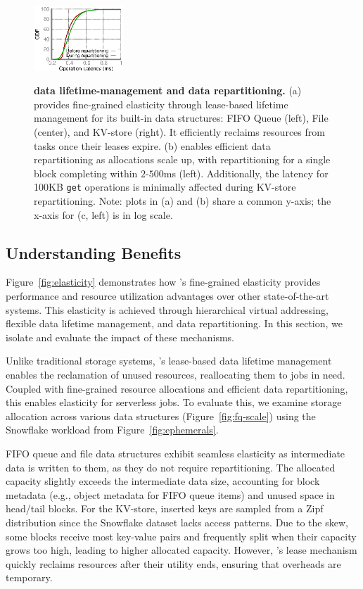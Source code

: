 \begin{figure}[t]
{    \includegraphics[width = 0.3\textwidth]{fig/jiffy/hash_table_scaling_get}
    \label{fig:op-latency-scaling}
    \label{fig:scale-latency}
  }
  \caption[\jiffy data lifetime-management and data repartitioning]{\textbf{\jiffy data lifetime-management and data repartitioning.} (a) \jiffy provides fine-grained elasticity through lease-based lifetime management for its built-in data structures: FIFO Queue (left), File (center), and KV-store (right). It efficiently reclaims resources from tasks once their leases expire. (b) \jiffy enables efficient data repartitioning as allocations scale up, with repartitioning for a single block completing within $2$-$500$ms (left). Additionally, the latency for 100KB \texttt{get} operations is minimally affected during KV-store repartitioning. Note: plots in (a) and (b) share a common y-axis; the x-axis for (c, left) is in log scale.}
\end{figure}


\subsection{Understanding \jiffy Benefits}
\label{ssec:jiffybenefits}

Figure~\ref{fig:elasticity} demonstrates how \jiffy's fine-grained elasticity provides performance and resource utilization advantages over other state-of-the-art systems. This elasticity is achieved through hierarchical virtual addressing, flexible data lifetime management, and data repartitioning. In this section, we isolate and evaluate the impact of these mechanisms.

 Unlike traditional storage systems, \jiffy’s lease-based data lifetime management enables the reclamation of unused resources, reallocating them to jobs in need. Coupled with fine-grained resource allocations and efficient data repartitioning, this enables elasticity for serverless jobs. To evaluate this, we examine storage allocation across various \jiffy data structures (Figure~\ref{fig:fq-scale}) using the Snowflake workload from Figure~\ref{fig:ephemerals}.

FIFO queue and file data structures exhibit seamless elasticity as intermediate data is written to them, as they do not require repartitioning. The allocated capacity slightly exceeds the intermediate data size, accounting for block metadata (e.g., object metadata for FIFO queue items) and unused space in head/tail blocks. For the KV-store, inserted keys are sampled from a Zipf distribution since the Snowflake dataset lacks access patterns. Due to the skew, some \jiffy blocks receive most key-value pairs and frequently split when their capacity grows too high, leading to higher allocated capacity. However, \jiffy’s lease mechanism quickly reclaims resources after their utility ends, ensuring that overheads are temporary.

